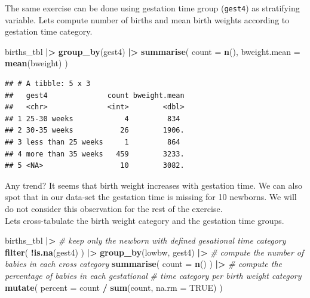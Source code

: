 \documentclass[
]{book}
\newenvironment{Shaded}{\begin{snugshade}}{\end{snugshade}}
\newcommand{\AttributeTok}[1]{\textcolor[rgb]{0.13,0.29,0.53}{#1}}
\newcommand{\CommentTok}[1]{\textcolor[rgb]{0.56,0.35,0.01}{\textit{#1}}}
\newcommand{\ConstantTok}[1]{\textcolor[rgb]{0.56,0.35,0.01}{#1}}
\newcommand{\FunctionTok}[1]{\textcolor[rgb]{0.13,0.29,0.53}{\textbf{#1}}}
\newcommand{\NormalTok}[1]{#1}
\newcommand{\SpecialCharTok}[1]{\textcolor[rgb]{0.81,0.36,0.00}{\textbf{#1}}}
\begin{document}
The same exercise can be done using gestation time group (\texttt{gest4}) as stratifying variable.
Lets compute number of births and mean birth weights according to gestation time category.

\begin{Shaded}
\begin{Highlighting}[]
\NormalTok{births\_tbl }\SpecialCharTok{|\textgreater{}}
  \FunctionTok{group\_by}\NormalTok{(gest4) }\SpecialCharTok{|\textgreater{}}
  \FunctionTok{summarise}\NormalTok{(}
    \AttributeTok{count =} \FunctionTok{n}\NormalTok{(),}
    \AttributeTok{bweight.mean =} \FunctionTok{mean}\NormalTok{(bweight)}
\NormalTok{  )}
\end{Highlighting}
\end{Shaded}

\begin{verbatim}
## # A tibble: 5 x 3
##   gest4              count bweight.mean
##   <chr>              <int>        <dbl>
## 1 25-30 weeks            4         834 
## 2 30-35 weeks           26        1906.
## 3 less than 25 weeks     1         864 
## 4 more than 35 weeks   459        3233.
## 5 <NA>                  10        3082.
\end{verbatim}

Any trend?
It seems that birth weight increases with gestation time.
We can also spot that in our data-set the gestation time is missing for 10 newborns.
We will do not consider this observation for the rest of the exercise.\\
Lets cross-tabulate the birth weight category and the gestation time groups.

\begin{Shaded}
\begin{Highlighting}[]
\NormalTok{births\_tbl }\SpecialCharTok{|\textgreater{}}
  \CommentTok{\# keep only the newborn with defined gesational time category}
  \FunctionTok{filter}\NormalTok{(}
    \SpecialCharTok{!}\FunctionTok{is.na}\NormalTok{(gest4)}
\NormalTok{  ) }\SpecialCharTok{|\textgreater{}}
  \FunctionTok{group\_by}\NormalTok{(lowbw, gest4) }\SpecialCharTok{|\textgreater{}}
  \CommentTok{\# compute the number of babies in each cross category}
  \FunctionTok{summarise}\NormalTok{(}
    \AttributeTok{count =} \FunctionTok{n}\NormalTok{()}
\NormalTok{  ) }\SpecialCharTok{|\textgreater{}}
  \CommentTok{\# compute the percentage of babies in each gestational }
  \CommentTok{\# time category per birth weight category}
  \FunctionTok{mutate}\NormalTok{(}
    \AttributeTok{percent =}\NormalTok{ count }\SpecialCharTok{/} \FunctionTok{sum}\NormalTok{(count, }\AttributeTok{na.rm =} \ConstantTok{TRUE}\NormalTok{)}
\NormalTok{  )}
\end{Highlighting}
\end{Shaded}
\end{document}
